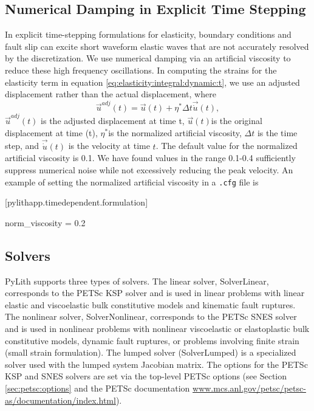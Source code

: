 \subsection{Numerical Damping in Explicit Time Stepping}

In explicit time-stepping formulations for elasticity, boundary conditions
and fault slip can excite short waveform elastic waves that are not
accurately resolved by the discretization. We use numerical damping
via an artificial viscosity\cite{Knopoff:Ni:2001,Day:Ely:2002} to
reduce these high frequency oscillations. In computing the strains
for the elasticity term in equation \vref{eq:elasticity:integral:dynamic:t},
we use an adjusted displacement rather than the actual displacement,
where 
\begin{equation}
\vec{u}^{adj}(t)=\vec{u}(t)+\eta^{*}\Delta t\vec{\dot{u}}(t),
\end{equation}
$\vec{u}^{adj}(t)$ is the adjusted displacement at time t, $\vec{u}(t)$is
the original displacement at time (t), $\eta^{*}$is the normalized
artificial viscosity, $\Delta t$ is the time step, and $\vec{\dot{u}}(t)$
is the velocity at time $t$. The default value for the normalized
artificial viscosity is 0.1. We have found values in the range 0.1-0.4
sufficiently suppress numerical noise while not excessively reducing
the peak velocity. An example of setting the normalized artificial
viscosity in a \texttt{.cfg} file is
\begin{lyxcode}
{[}pylithapp.timedependent.formulation{]}

norm\_viscosity = 0.2
\end{lyxcode}

\subsection{\label{sec:solvers}Solvers}

PyLith supports three types of solvers. The linear solver, SolverLinear,
corresponds to the PETSc KSP solver and is used in linear problems
with linear elastic and viscoelastic bulk constitutive models and
kinematic fault ruptures. The nonlinear solver, SolverNonlinear, corresponds
to the PETSc SNES solver and is used in nonlinear problems with nonlinear
viscoelastic or elastoplastic bulk constitutive models, dynamic fault
ruptures, or problems involving finite strain (small strain formulation).
The lumped solver (SolverLumped) is a specialized solver used with
the lumped system Jacobian matrix. The options for the PETSc KSP and
SNES solvers are set via the top-level PETSc options (see Section
\vref{sec:petsc:options} and the PETSc documentation \url{www.mcs.anl.gov/petsc/petsc-as/documentation/index.html}).



